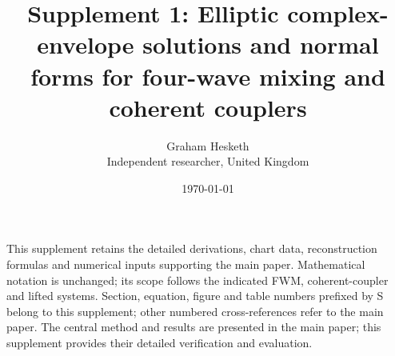 \documentclass[11pt,a4paper]{article}
\begin{document}
\title{Supplement 1: Elliptic complex-envelope solutions and normal forms for four-wave mixing and coherent couplers}
\author{Graham Hesketh \\
\small Independent researcher, United Kingdom}
\date{\today}
\maketitle
This supplement retains the detailed derivations, chart data, reconstruction formulas and numerical inputs supporting the main paper.
Mathematical notation is unchanged; its scope follows the indicated FWM, coherent-coupler and lifted systems.
Section, equation, figure and table numbers prefixed by S belong to this supplement; other numbered cross-references refer to the main paper.
The central method and results are presented in the main paper; this supplement provides their detailed verification and evaluation.
\end{document}
